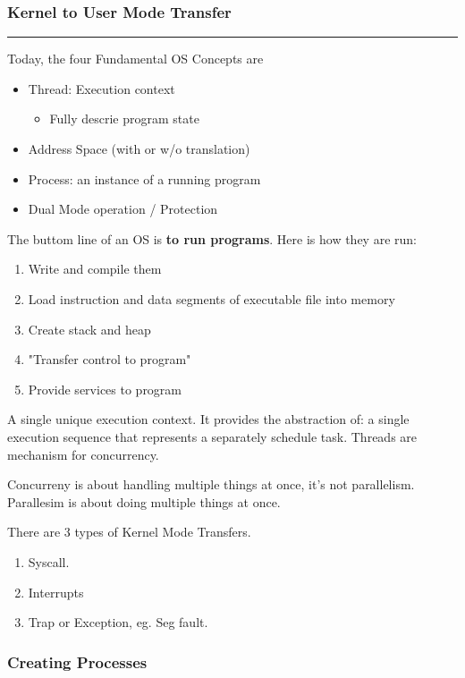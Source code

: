 \documentclass{article}
\begin{document}
\subsubsection{Kernel to User Mode Transfer}

\hrule


Today, the four Fundamental OS Concepts are
\begin{itemize}
    \item Thread: Execution context
          \begin{itemize}
              \item Fully descrie program state
          \end{itemize}
    \item Address Space (with or w/o translation)
    \item Process: an instance of a running program
    \item Dual Mode operation / Protection
\end{itemize}

The buttom line of an OS is \textbf{to run programs}. Here is how they are run:
\begin{enumerate}
    \item Write and compile them
    \item Load instruction and data segments of executable file into memory
    \item Create stack and heap
    \item "Transfer control to program"
    \item Provide services to program
\end{enumerate}

\newpage
{}

\begin{definition}[Thread]
    A single unique execution context. It provides the abstraction of: a single execution sequence that represents a separately schedule task. Threads are mechanism for concurrency.
\end{definition}

Concurreny is about handling multiple things at once, it's not parallelism. Parallesim is about doing multiple things at once.

\newpage
{}
There are 3 types of Kernel Mode Transfers.

\begin{enumerate}
    \item Syscall.
    \item Interrupts
    \item Trap or Exception, eg. Seg fault.
\end{enumerate}

\subsubsection{Creating Processes}
\end{document}
